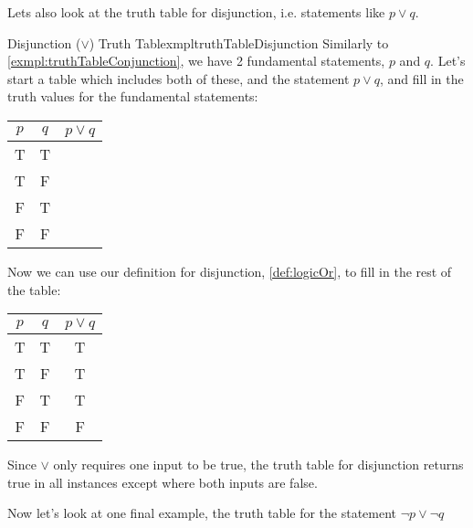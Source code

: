 Lets also look at the truth table for disjunction, i.e. statements like $p \lor q$.

\begin{exmpl}[label={exmpl:truthTableDisjunction}]{Disjunction ($\lor$) Truth Table}{xmpltruthTableDisjunction}
    Similarly to \cref{exmpl:truthTableConjunction}, we have 2 fundamental statements, $p$ and $q$. Let's start a table which includes both of these, and the statement $p \lor q$, and fill in the truth values for the fundamental statements:
    \begin{center}
        \begin{tabular}{|c|c|c|}
            \hline
            $p$ & $q$ & $p \lor q$ \\
            \hline
            T   & T   &            \\
            \hline
            T   & F   &            \\
            \hline
            F   & T   &            \\
            \hline
            F   & F   &            \\
            \hline
        \end{tabular}
    \end{center}

    Now we can use our definition for disjunction, \cref{def:logicOr}, to fill in the rest of the table: \begin{center}
        \begin{tabular}{|c|c|c|}
            \hline
            $p$ & $q$ & $p \lor q$ \\
            \hline
            T   & T   & T          \\
            \hline
            T   & F   & T          \\
            \hline
            F   & T   & T          \\
            \hline
            F   & F   & F          \\
            \hline
        \end{tabular}
    \end{center}

    Since $\lor$ only requires one input to be true, the truth table for disjunction returns true in all instances except where both inputs are false.
\end{exmpl}

Now let's look at one final example, the truth table for the statement $\lnot p \lor \lnot q$
\newpage

